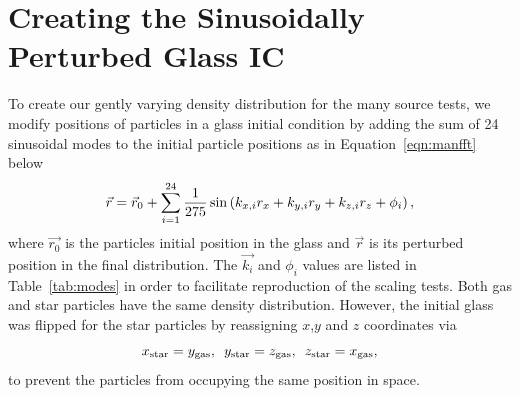 \documentclass[fleq,usenatbib]{mnras}
\begin{document}
{\section{Creating the Sinusoidally Perturbed Glass IC}
\label{sec:icnd}
To create our gently varying density distribution for the many source tests, 
we modify positions of particles in a glass initial condition by adding the 
sum of 24 sinusoidal modes to the initial particle positions as in 
Equation~\ref{eqn:manfft} below
\begin{equation}\label{eqn:manfft}
\vec{r} = \vec{r}_{\rm 0} + \sum_{i=1}^{24} \frac{1}{275} \sin 
\left( k_{x,i} r_x + k_{y,i} r_y + k_{z,i} r_z + \phi_i\right),
\end{equation}
where $\vec{r_0}$ is the particles initial position in the glass and $\vec{r}$ 
is its perturbed position in the final distribution. The $\vec{k_i}$ and 
$\phi_i$ values are listed in Table~\ref{tab:modes} in order to facilitate 
reproduction of the scaling tests. Both gas and star particles have the same 
density distribution. However, the initial glass was flipped for the star 
particles by reassigning $x$,$y$ and $z$ coordinates via
 \begin{equation}
 x_{\rm star} = y_{\rm gas}, \hspace{5pt} y_{\rm star} = z_{\rm gas}, 
 \hspace{5pt} z_{\rm star} = x_{\rm gas},
 \end{equation}
to prevent the particles from occupying the same position in space.

}
\end{document}
